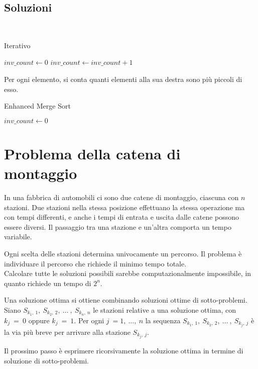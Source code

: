 \subsection{Soluzioni}
~
\begin{algorithm}
    \caption{Iterativo}
    \label{inv_it}
    \begin{algorithmic}
        \State $inv\_count \gets 0$
            \State $inv\_count \gets inv\_count + 1$
            \EndFor
        \EndFor
        \EndFunction
    \end{algorithmic}
\end{algorithm}

Per ogni elemento, si conta quanti elementi alla sua destra sono più piccoli di esso.
\begin{algorithm}
    \caption{Enhanced Merge Sort}
    \label{inv_me}
    \begin{algorithmic}
            \State $inv\_count \gets 0$
        \EndFunction
    \end{algorithmic}
\end{algorithm}

\newpage
\section{Problema della catena di montaggio}
In una fabbrica di automobili ci sono due catene di montaggio, ciascuna con $n$ stazioni. Due stazioni nella stessa posizione effettuano la stessa operazione ma con tempi differenti, e anche i tempi di entrata e uscita dalle catene possono essere diversi. Il passaggio tra una stazione e un'altra comporta un tempo variabile. \par

Ogni scelta delle stazioni determina univocamente un percorso. Il problema è individuare il percorso che richiede il minimo tempo totale. \\
Calcolare tutte le soluzioni possibili sarebbe computazionalmente impossibile, in quanto richiede un tempo di $2^n$. \par 

Una soluzione ottima si ottiene combinando soluzioni ottime di sotto-problemi. Siano $S_{k_1,\:1},\:S_{k_2,\:2},\:\dots \:,\:S_{k_n,\:n}$ le stazioni relative a una soluzione ottima, con $k_j\:=\:0$ oppure $k_j\:=\:1$. Per ogni $j\:=1,\: \dots, \:n$ la sequenza $S_{k_1,\:1},\:S_{k_2,\:2},\:\dots \:,\:S_{k_j,\:j}$ è la via più breve per arrivare alla stazione $S_{k_j,\:j}$. \par 
Il prossimo passo è esprimere ricorsivamente la soluzione ottima in termine di soluzione di sotto-problemi. 
